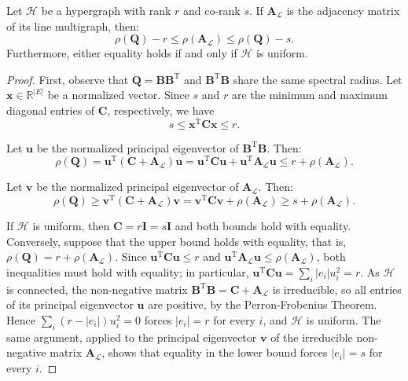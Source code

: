\documentclass[12pt,reqno]{amsart}
\begin{document}
\begin{theorem}\label{teo:raio_espectral}
Let $\mathcal{H}$ be a hypergraph with rank $r$ and co-rank $s$. If $\mathbf{A}_{\mathcal{L}}$ is the adjacency matrix of its line multigraph, then:
$$\rho(\mathbf{Q}) - r \leq \rho(\mathbf{A}_{\mathcal{L}}) \leq \rho(\mathbf{Q}) - s.$$
Furthermore, either equality holds if and only if $\mathcal{H}$ is uniform.
\end{theorem}

\begin{proof}
First, observe that $\mathbf{Q} = \mathbf{B}\mathbf{B}^\mathrm{T}$ and $\mathbf{B}^\mathrm{T}\mathbf{B}$ share the same spectral radius. Let $\mathbf{x} \in \mathbb{R}^{|E|}$ be a normalized vector. Since $s$ and $r$ are the minimum and maximum diagonal entries of $\mathbf{C}$, respectively, we have
\begin{equation*}
s \leq \mathbf{x}^\mathrm{T}\mathbf{C}\mathbf{x} \leq r.
\end{equation*}

Let $\mathbf{u}$ be the normalized principal eigenvector of $\mathbf{B}^\mathrm{T}\mathbf{B}$. Then:$$\rho(\mathbf{Q}) = \mathbf{u}^\mathrm{T}(\mathbf{C} + \mathbf{A}_{\mathcal{L}})\mathbf{u} = \mathbf{u}^\mathrm{T}\mathbf{C}\mathbf{u} + \mathbf{u}^\mathrm{T}\mathbf{A}_{\mathcal{L}}\mathbf{u} \leq r + \rho(\mathbf{A}_{\mathcal{L}}).$$

Let $\mathbf{v}$ be the normalized principal eigenvector of $\mathbf{A}_{\mathcal{L}}$. Then:
$$\rho(\mathbf{Q}) \geq \mathbf{v}^\mathrm{T}(\mathbf{C} + \mathbf{A}_{\mathcal{L}})\mathbf{v} = \mathbf{v}^\mathrm{T}\mathbf{C}\mathbf{v} + \rho(\mathbf{A}_{\mathcal{L}}) \geq s + \rho(\mathbf{A}_{\mathcal{L}}).$$


If $\mathcal{H}$ is uniform, then $\mathbf{C} = r\mathbf{I} = s\mathbf{I}$ and both bounds hold with equality. Conversely, suppose that the upper bound holds with equality, that is, $\rho(\mathbf{Q}) = r + \rho(\mathbf{A}_{\mathcal{L}})$. Since $\mathbf{u}^\mathrm{T}\mathbf{C}\mathbf{u} \leq r$ and $\mathbf{u}^\mathrm{T}\mathbf{A}_{\mathcal{L}}\mathbf{u} \leq \rho(\mathbf{A}_{\mathcal{L}})$, both inequalities must hold with equality; in particular, $\mathbf{u}^\mathrm{T}\mathbf{C}\mathbf{u} = \sum_{i} |e_i| u_i^2 = r$. As $\mathcal{H}$ is connected, the non-negative matrix $\mathbf{B}^\mathrm{T}\mathbf{B} = \mathbf{C} + \mathbf{A}_{\mathcal{L}}$ is irreducible, so all entries of its principal eigenvector $\mathbf{u}$ are positive, by the Perron-Frobenius Theorem. Hence $\sum_{i} (r - |e_i|)u_i^2 = 0$ forces $|e_i| = r$ for every $i$, and $\mathcal{H}$ is uniform. The same argument, applied to the principal eigenvector $\mathbf{v}$ of the irreducible non-negative matrix $\mathbf{A}_{\mathcal{L}}$, shows that equality in the lower bound forces $|e_i| = s$ for every $i$.
\end{proof}
\end{document}
